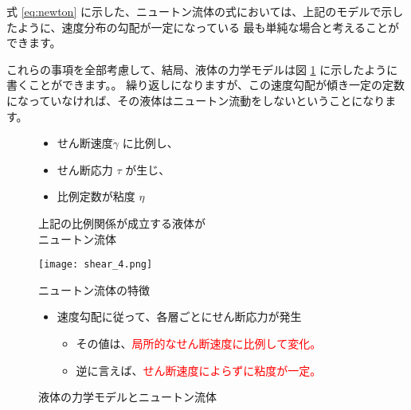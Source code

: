 \documentclass[uplatex,dvipdfmx,a4paper,11pt]{jsreport}
\begin{document}
式 \eqref{eq:newton} に示した、ニュートン流体の式においては、上記のモデルで示したように、速度分布の勾配が一定になっている
最も単純な場合と考えることができます。

これらの事項を全部考慮して、結局、液体の力学モデルは図 \ref{fig:ryudo_model2} に示したように書くことができます。。
繰り返しになりますが、この速度勾配が傾き一定の定数になっていなければ、その液体はニュートン流動をしないということになります。

\begin{figure}[htb]
	\begin{center}
		\begin{minipage}{0.45\textwidth}
			\begin{itemize}
				\item せん断速度$\dot{\gamma}$ に比例し、
				\item せん断応力 $\tau$ が生じ、
				\item 比例定数が粘度 $\eta$
			\end{itemize}
			\begin{center}
				\begin{screen}
					\begin{center}
						上記の比例関係が成立する液体が\\ニュートン流体
					\end{center}
				\end{screen}
			\end{center}
		\end{minipage}
		\begin{minipage}{0.45\textwidth}
			\begin{center}
			\texttt{[image: shear\_4.png]}
			\end{center}
		\end{minipage}
		\begin{minipage}{0.9\textwidth}
			\begin{center}
			\begin{itembox}[l]{ニュートン流体の特徴}
				\begin{itemize}
					\item 速度勾配に従って、各層ごとにせん断応力が発生
					\begin{itemize}
						\item その値は、\textcolor{red}{局所的なせん断速度に比例して変化。}
						\item 逆に言えば、\textcolor{red}{せん断速度によらずに粘度が一定。}
					\end{itemize}
				\end{itemize}
			\end{itembox}
			\end{center}
		\end{minipage}
		\caption{液体の力学モデルとニュートン流体}
		\label{fig:ryudo_model2}
	\end{center}
\end{figure}
\end{document}
